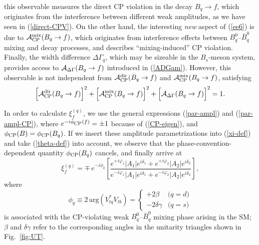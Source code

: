 \documentclass[12pt]{article}
\begin{document}
this observable measures the direct CP violation in the decay
$B_q\to f$, which originates from the interference between different
weak amplitudes, as we have seen in (\ref{direct-CPV}). On the other
hand, the interesting {\it new} aspect of (\ref{ee6}) is due to 
${\cal A}^{\mbox{{\scriptsize mix}}}_{\mbox{{\scriptsize
CP}}}(B_q\to f)$, which originates from interference effects between 
$B_q^0$--$\bar B_q^0$ mixing and decay processes, and describes
``mixing-induced'' CP violation. Finally, the width difference 
$\Delta\Gamma_q$, which may be sizeable in the $B_s$-meson system, 
provides access to ${\cal A}_{\Delta\Gamma}(B_q\to f)$  introduced 
in (\ref{ADGam}). However, this observable is not independent from 
${\cal A}^{\mbox{{\scriptsize dir}}}_{\mbox{{\scriptsize CP}}}(B_q\to f)$ and 
${\cal A}^{\mbox{{\scriptsize mix}}}_{\mbox{{\scriptsize CP}}}(B_q\to f)$,
satisfying 
\begin{equation}\label{Obs-rel}
\Bigl[{\cal A}_{\rm CP}^{\rm dir}(B_q\to f)\Bigr]^2+
\Bigl[{\cal A}_{\rm CP}^{\rm mix}(B_q\to f)\Bigr]^2+
\Bigl[{\cal A}_{\Delta\Gamma}(B_q\to f)\Bigr]^2=1.
\end{equation}

In order to calculate $\xi_f^{(q)}$, we use the general expressions
(\ref{par-ampl}) and (\ref{par-ampl-CP}), where 
$e^{-i\phi_{\mbox{{\scriptsize CP}}}(f)}=\pm1$ because of (\ref{CP-eigen}), and 
$\phi_{\mbox{{\scriptsize CP}}}(B)=\phi_{\mbox{{\scriptsize CP}}}(B_q)$. If we insert
these amplitude parametrizations into (\ref{xi-def}) and take (\ref{theta-def}) into 
account, we observe that the phase-convention-dependent 
quantity $\phi_{\mbox{{\scriptsize CP}}}(B_q)$ cancels, and finally 
arrive at
\begin{equation}\label{xi-re}
\xi_f^{(q)}=\mp\, e^{-i\phi_q}\left[
\frac{e^{+i\varphi_1}|A_1|e^{i\delta_1}+
e^{+i\varphi_2}|A_2|e^{i\delta_2}}{
e^{-i\varphi_1}|A_1|e^{i\delta_1}+
e^{-i\varphi_2}|A_2|e^{i\delta_2}}\right],
\end{equation}
where
\begin{equation}\label{phiq-def}
\phi_q\equiv 2\,\mbox{arg} (V_{tq}^\ast V_{tb})=\left\{\begin{array}{cl}
+2\beta&\mbox{($q=d$)}\\
-2\delta\gamma&\mbox{($q=s$)}\end{array}\right.
\end{equation}
is associated with the CP-violating weak $B_q^0$--$\bar B_q^0$ mixing
phase arising in the SM; $\beta$ and $\delta\gamma$ refer to the corresponding
angles in the unitarity triangles shown in Fig.\ \ref{fig:UT}.
\end{document}
